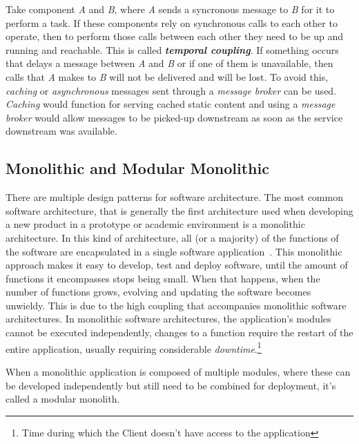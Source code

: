 Take component \textit{A} and \textit{B}, where \textit{A} sends a syncronous message to \textit{B} for it to perform a task. If these components rely on synchronous calls to each other to operate, then to perform those calls between each other they need to be up and running and reachable. This is called \textbf{\textit{temporal coupling}}. If something occurs that delays a message between \textit{A} and \textit{B} or if one of them is unavailable, then calls that \textit{A} makes to \textit{B} will not be delivered and will be lost. To avoid this, \textit{caching} or \textit{asynchronous} messages sent through a \textit{message broker} can be used. \textit{Caching} would function for serving cached static content and using a \textit{message broker} would allow messages to be picked-up downstream as soon as the service downstream was available.




\subsection{Monolithic and Modular Monolithic}\label{state-of-the-art:ss:monolithic-or-modular-and-their-differences}

There are multiple design patterns for software architecture. The most common software architecture, that is generally the first architecture used when developing a new product in a prototype or academic environment is a monolithic architecture. In this kind of architecture, all (or a majority) of the functions of the software are encapsulated in a single software application~\Parencite{chen_li_li_2017}. This monolithic approach makes it easy to develop, test and deploy software, until the amount of functions it encompasses stops being small. When that happens, when the number of functions grows, evolving and updating the software becomes unwieldy. This is due to the high coupling that accompanies monolithic software architectures. In monolithic software architectures, the application's modules cannot be executed independently, changes to a function require the restart of the entire application, usually requiring considerable \textit{downtime}.\footnote{\label{foot:downtime}Time during which the Client doesn't have access to the application}



When a monolithic application is composed of multiple modules, where these can be developed independently but still need to be combined for deployment, it's called a modular monolith. 


